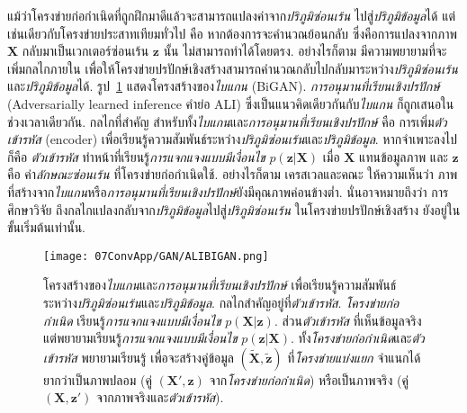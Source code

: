 แม้ว่าโครงข่ายก่อกำเนิดที่ถูกฝึกมาดีแล้วจะสามารถแปลงค่าจาก\textit{ปริภูมิซ่อนเร้น} ไปสู่\textit{ปริภูมิข้อมูล}ได้
แต่เช่นเดียวกับโครงข่ายประสาทเทียมทั่วไป คือ หากต้องการจะคำนวณย้อนกลับ ซึ่งคือการแปลงจากภาพ $\bm{X}$ กลับมาเป็นเวกเตอร์ซ่อนเร้น $\bm{z}$ นั้น ไม่สามารถทำได้โดยตรง.
อย่างไรก็ตาม มีความพยายามที่จะเพิ่มกลไกภายใน เพื่อให้โครงข่ายปรปักษ์เชิงสร้างสามารถคำนวณกลับไปกลับมาระหว่าง\textit{ปริภูมิซ่อนเร้น} และ\textit{ปริภูมิข้อมูล}ได้.
รูป~\ref{fig: conv app ALI/BiGAN} แสดงโครงสร้างของ\textit{ไบแกน} (BiGAN\cite{BiGAN}).
\textit{การอนุมานที่เรียนเชิงปรปักษ์} (Adversarially learned inference คำย่อ ALI\cite{ALI}) ซึ่งเป็นแนวคิดเดียวกันกับ\textit{ไบแกน} ก็ถูกเสนอในช่วงเวลาเดียวกัน.
กลไกที่สำคัญ สำหรับทั้ง\textit{ไบแกน}และ\textit{การอนุมานที่เรียนเชิงปรปักษ์} 
คือ การเพิ่ม\textit{ตัวเข้ารหัส} (encoder)
เพื่อเรียนรู้ความสัมพันธ์ระหว่าง\textit{ปริภูมิซ่อนเร้น}และ\textit{ปริภูมิข้อมูล}.
หากจำเพาะลงไปก็คือ
\textit{ตัวเข้ารหัส} ทำหน้าที่เรียนรู้\textit{การแจกแจงแบบมีเงื่อนไข} $p(\bm{z}|\bm{X})$ เมื่อ $\bm{X}$ แทนข้อมูลภาพ และ $\bm{z}$ คือ ค่า\textit{ลักษณะซ่อนเร้น} ที่โครงข่ายก่อกำเนิดใช้.
%
อย่างไรก็ตาม เครสเวลและคณะ\cite{OverviewGAN2018} ให้ความเห็นว่า ภาพที่สร้างจาก\textit{ไบแกน}หรือ\textit{การอนุมานที่เรียนเชิงปรปักษ์}ยังมีคุณภาพค่อนข้างต่ำ.
นั่นอาจหมายถึงว่า การศึกษาวิจัย
ถึงกลไกแปลงกลับจาก\textit{ปริภูมิข้อมูล}ไปสู่\textit{ปริภูมิซ่อนเร้น}
ในโครงข่ายปรปักษ์เชิงสร้าง ยังอยู่ในขั้นเริ่มต้นเท่านั้น.

%
\begin{figure}
	\begin{center}
		\texttt{[image: 07ConvApp/GAN/ALIBIGAN.png]}
		\caption[โครงสร้างของไบแกนและการอนุมานที่เรียนเชิงปรปักษ์]{
		โครงสร้างของ\textit{ไบแกน}และ\textit{การอนุมานที่เรียนเชิงปรปักษ์}
		เพื่อเรียนรู้ความสัมพันธ์ระหว่าง\textit{ปริภูมิซ่อนเร้น}และ\textit{ปริภูมิข้อมูล}.
		กลไกสำคัญอยู่ที่\textit{ตัวเข้ารหัส}.
		\textit{โครงข่ายก่อกำเนิด} เรียนรู้\textit{การแจกแจงแบบมีเงื่อนไข} $p(\bm{X}|\bm{z})$.
		ส่วน\textit{ตัวเข้ารหัส} ที่เห็นข้อมูลจริง แต่พยายามเรียนรู้\textit{การแจกแจงแบบมีเงื่อนไข} $p(\bm{z}|\bm{X})$.
		ทั้ง\textit{โครงข่ายก่อกำเนิด}และ\textit{ตัวเข้ารหัส} พยายามเรียนรู้ เพื่อจะสร้างคู่ข้อมูล $(\bm{\tilde{X}}, \bm{\tilde{z}})$ ที่\textit{โครงข่ายแบ่งแยก} จำแนกได้ยากว่าเป็นภาพปลอม (คู่ $(\bm{X'}, \bm{z})$ จาก\textit{โครงข่ายก่อกำเนิด}) หรือเป็นภาพจริง (คู่ $(\bm{X}, \bm{z'})$ จากภาพจริงและ\textit{ตัวเข้ารหัส}).
		}
		\label{fig: conv app ALI/BiGAN}
	\end{center}
\end{figure}
%



